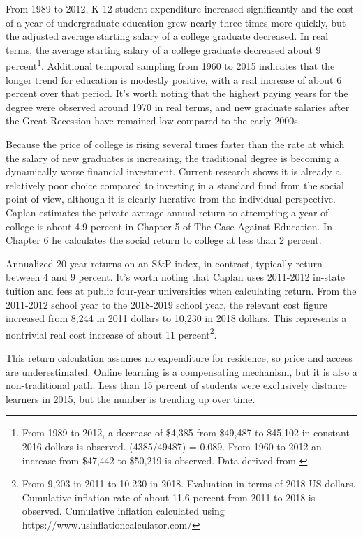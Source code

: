 \documentclass[AER]{./aea-latex-templates/AEA}
\begin{document}
From 1989 to 2012, K-12 student expenditure increased significantly and
the cost of a year of undergraduate education grew nearly three times more
quickly, but the adjusted average starting salary of a college graduate
decreased. In real terms, the average starting salary of a college
graduate decreased about 9 percent\footnote{From 1989 to 2012, a decrease of \$4,385 from \$49,487 to
\$45,102 in constant 2016 dollars is observed. (4385/49487) = 0.089. From 1960 to 2012 an increase from
\$47,442 to \$50,219 is observed. Data derived from \cite{koncz2016}}.
Additional temporal sampling from 1960 to 2015 indicates that the longer trend for education is modestly positive,
with a real increase of about 6 percent over that period. It’s worth noting that
the highest paying years for the degree were observed around 1970 in real
terms, and new graduate salaries after the Great Recession have remained low
compared to the early 2000s.

Because the price of college is rising several times faster than the rate
at which the salary of new graduates is increasing, the traditional degree
is becoming a dynamically worse financial investment. Current research
shows it is already a relatively poor choice compared to investing in a
standard fund from the social point of view, although it is clearly
lucrative from the individual perspective. Caplan estimates the private
average annual return to attempting a year of college is about 4.9 percent in
Chapter 5 of The Case Against Education. In Chapter 6 he calculates the
social return to college at less than 2 percent.

Annualized 20 year returns on an S\&P index, in contrast, typically
return between 4 and 9 percent\cite{isbitts_2018}. It’s worth noting that Caplan uses 2011-2012
in-state tuition and fees at public four-year universities when
calculating return. From the 2011-2012 school year to the 2018-2019 school
year, the relevant cost figure increased from 8,244 in 2011 dollars to
10,230 in 2018 dollars\cite{collegeboard2018fiveyearchange}. This represents
a nontrivial real cost increase of about 11 percent\footnote{From 9,203
in 2011 to 10,230 in 2018. Evaluation in terms of 2018 US dollars. Cumulative
inflation rate of about 11.6 percent from 2011 to 2018 is observed.
Cumulative inflation calculated using https://www.usinflationcalculator.com/}.

This return calculation assumes no expenditure for residence, so price
and access are underestimated. Online learning is a compensating
mechanism, but it is also a non-traditional path. Less than
15 percent of students were exclusively distance
learners\cite{nces2016percentexclusivelydistance} in 2015, but the
number is trending up over time.
\end{document}
